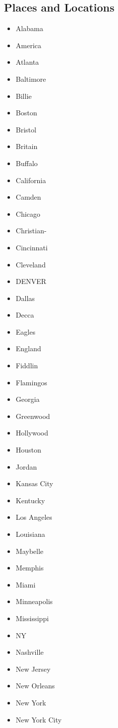 \documentclass[12pt,a4paper]{article}
\begin{document}
\subsection{Places and Locations}
\begin{itemize}
  \item Alabama
  \item America
  \item Atlanta
  \item Baltimore
  \item Billie
  \item Boston
  \item Bristol
  \item Britain
  \item Buffalo
  \item California
  \item Camden
  \item Chicago
  \item Christian-
  \item Cincinnati
  \item Cleveland
  \item DENVER
  \item Dallas
  \item Decca
  \item Eagles
  \item England
  \item Fiddlin
  \item Flamingos
  \item Georgia
  \item Greenwood
  \item Hollywood
  \item Houston
  \item Jordan
  \item Kansas City
  \item Kentucky
  \item Los Angeles
  \item Louisiana
  \item Maybelle
  \item Memphis
  \item Miami
  \item Minneapolis
  \item Mississippi
  \item NY
  \item Nashville
  \item New Jersey
  \item New Orleans
  \item New York
  \item New York City

\end{itemize}
\end{document}
